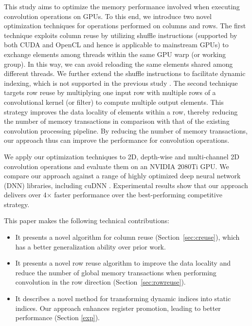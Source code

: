 This study aims to optimize the memory performance involved when executing convolution operations on GPUs. To this end, we introduce two novel optimization techniques
for operations performed on columns and rows. The first technique exploits column reuse by utilizing shuffle instructions (supported by
both CUDA and OpenCL and hence is applicable to mainstream GPUs) to exchange elements among threads within the same GPU warp (or working
group). In this way, we can avoid reloading the same elements shared among different threads. We further extend the shuffle instructions to
facilitate dynamic indexing, which is not supported in the previous study \cite{vasilache2014fast}. The second technique targets row reuse
by multiplying one input row with multiple rows of a convolutional kernel (or filter) to compute multiple output elements. This strategy
improves the data locality of elements within a row, thereby reducing the number of memory transactions in comparison with that of the
existing convolution processing pipeline. By reducing the number of memory transactions, our approach thus can improve the performance for
convolution operations.

We apply our optimization techniques to 2D,  depth-wise and multi-channel 2D convolution operations and evaluate them on an NVIDIA 2080Ti GPU. We compare
our approach against a range of highly optimized  deep neural network (DNN) libraries, including cuDNN \cite{ChetlurWVCTCS14}. Experimental
results show that our approach delivers over 4$\times$ faster performance over the best-performing competitive strategy.

This paper makes the following technical contributions:
\begin{itemize}
  \item It presents a novel algorithm for column reuse (Section~\ref{sec:creuse}), which has a better generalization
      ability over prior work.
  \item It presents a novel row reuse algorithm to improve the data locality and reduce the number of global memory transactions when
      performing convolution in the row direction (Section~\ref {sec:rowreuse}).
  \item It describes a novel method for transforming dynamic indices into static indices. Our approach enhances register promotion,
      leading to better performance (Section \ref{exp}).
\end{itemize}
